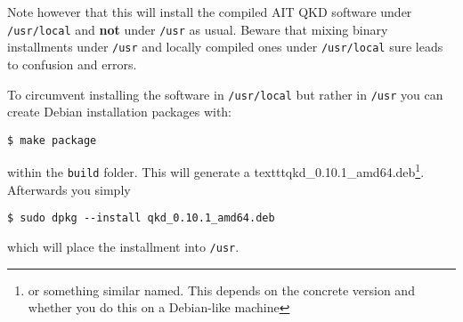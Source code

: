 Note however that this will install the compiled AIT QKD software under \texttt{/usr/local} and \textbf{not} under \texttt{/usr} as usual. Beware that mixing binary installments under \texttt{/usr} and locally compiled ones under \texttt{/usr/local} sure leads to confusion and errors.

\medskip

To circumvent installing the software in \texttt{/usr/local} but rather in \texttt{/usr} you can create Debian installation packages with:

\begin{minipage}{0.9\textwidth}
\bigskip
\begin{verbatim}
$ make package
\end{verbatim}
\medskip
\end{minipage}

within the \texttt{build} folder. This will generate a texttt{qkd\_0.10.1\_amd64.deb}\footnote{or something similar named. This depends on the concrete version and whether you do this on a Debian-like machine}. Afterwards you simply

\begin{minipage}{0.9\textwidth}
\bigskip
\begin{verbatim}
$ sudo dpkg --install qkd_0.10.1_amd64.deb
\end{verbatim}
\medskip
\end{minipage}

which will place the installment into \texttt{/usr}.


